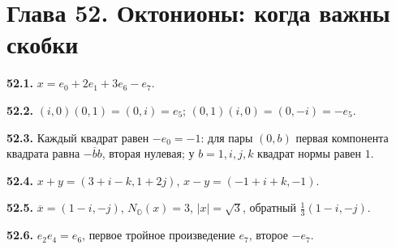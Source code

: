 \documentclass[12pt,a4paper,oneside,openany]{book}
\theoremstyle{colordef}\newtheorem{definition}{Определение}[chapter]
\theoremstyle{plain}\newtheorem{theorem}{Теорема}[chapter]
\theoremstyle{definition}\newtheorem{axiom}{Аксиома}[chapter]
\begin{document}
\section*{Глава 52. Октонионы: когда важны скобки}
\begingroup\setlength{\parskip}{0pt}
\textbf{52.1.} \(x=e_0+2e_1+3e_6-e_7\).\par
\textbf{52.2.} \((i,0)(0,1)=(0,i)=e_5\); \((0,1)(i,0)=(0,-i)=-e_5\).\par
\textbf{52.3.} Каждый квадрат равен \(-e_0=-1\): для пары \((0,b)\) первая компонента квадрата равна \(-\overline b b\), вторая нулевая; у \(b=1,i,j,k\) квадрат нормы равен \(1\).\par
\textbf{52.4.} \(x+y=(3+i-k,1+2j)\), \(x-y=(-1+i+k,-1)\).\par
\textbf{52.5.} \(\overline x=(1-i,-j)\), \(N_{\mathbb O}(x)=3\), \(|x|=\sqrt3\), обратный \(\frac13(1-i,-j)\).\par
\textbf{52.6.} \(e_2e_4=e_6\), первое тройное произведение \(e_7\), второе \(-e_7\).\par
\end{document}
